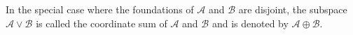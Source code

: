 In the special case where the foundations of $\mathcal{A}$ and $\mathcal{B}$ are disjoint, the subspace $\mathcal{A} \vee \mathcal{B}$ is called the coordinate sum of $\mathcal{A}$ and $\mathcal{B}$ and is denoted by $\mathcal{A} \oplus \mathcal{B}$.
